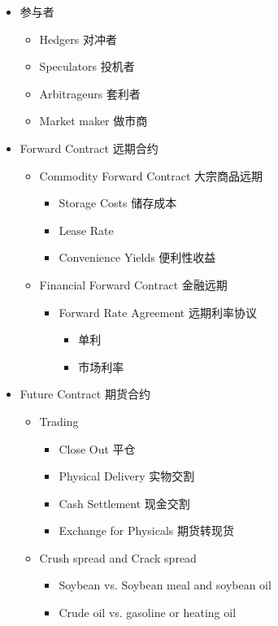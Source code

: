 \documentclass[a4paper,6pt,twoside,openany]{article}
\begin{document}
\begin{itemize}
\item 参与者
  \begin{itemize}
  \item Hedgers 对冲者
  \item Speculators 投机者
  \item Arbitrageurs 套利者
  \item Market maker 做市商
  \end{itemize}
\item Forward Contract 远期合约
  \begin{itemize}
  \item Commodity Forward Contract 大宗商品远期
    \begin{itemize}
    \item Storage Costs 储存成本
    \item Lease Rate
    \item Convenience Yields 便利性收益
    \end{itemize}
  \item Financial Forward Contract 金融远期
    \begin{itemize}
    \item Forward Rate Agreement 远期利率协议
      \begin{itemize}
      \item 单利
      \item 市场利率
      \end{itemize}
    \end{itemize}
  \end{itemize}
\item Future Contract 期货合约
  \begin{itemize}
  \item Trading
    \begin{itemize}
    \item Close Out 平仓
    \item Physical Delivery 实物交割
    \item Cash Settlement 现金交割
    \item Exchange for Physicals 期货转现货
    \end{itemize}
  \item Crush spread and Crack spread
    \begin{itemize}
    \item Soybean vs. Soybean meal and soybean oil
    \item Crude oil vs. gasoline or heating oil
    \end{itemize}

\end{itemize}
\end{itemize}
\end{document}

